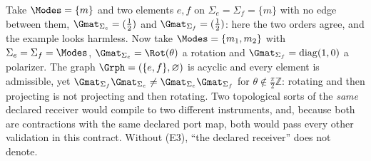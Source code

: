 
\begin{remark}
\label{rem:e3}
Take $\Modes=\{m\}$ and two elements $e,f$ on $\Sigma_e=\Sigma_f=\{m\}$ with no
edge between them, $\Gmat_{\Sigma_e}=(\tfrac12)$ and
$\Gmat_{\Sigma_f}=(\tfrac12)$: here the two orders agree, and the example
looks harmless. Now take $\Modes=\{m_1,m_2\}$ with
$\Sigma_e=\Sigma_f=\Modes$, $\Gmat_{\Sigma_e}=\Rot(\theta)$ a rotation and
$\Gmat_{\Sigma_f}=\operatorname{diag}(1,0)$ a polarizer. The graph
$\Grph=(\{e,f\},\varnothing)$ is acyclic and every element is admissible, yet
$\Gmat_{\Sigma_f}\Gmat_{\Sigma_e}\neq\Gmat_{\Sigma_e}\Gmat_{\Sigma_f}$ for
$\theta\notin\frac{\pi}{2}\mathbb{Z}$: rotating and then projecting is not
projecting and then rotating. Two topological sorts of the \emph{same} declared
receiver would compile to two different instruments, and, because both are
contractions with the same declared port map, both would pass every other
validation in this contract. Without (E3), ``the declared receiver'' does not
denote.
\end{remark}
